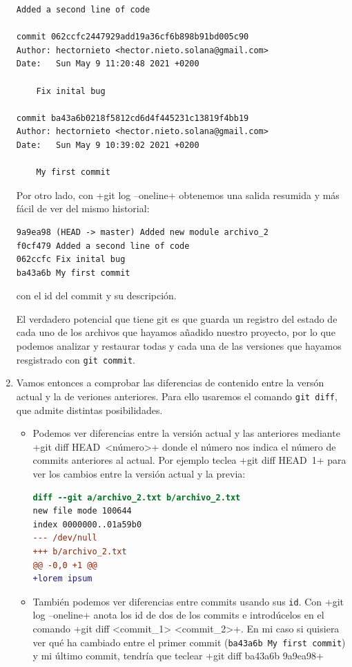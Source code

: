 \documentclass[a4paper,10pt]{article}
\begin{document}
\begin{enumerate}
\begin{lstlisting}[style=custom]
    Added a second line of code

commit 062ccfc2447929add19a36cf6b898b91bd005c90
Author: hectornieto <hector.nieto.solana@gmail.com>
Date:   Sun May 9 11:20:48 2021 +0200

    Fix inital bug

commit ba43a6b0218f5812cd6d4f445231c13819f4bb19
Author: hectornieto <hector.nieto.solana@gmail.com>
Date:   Sun May 9 10:39:02 2021 +0200

    My first commit
    \end{lstlisting}
    
    Por otro lado, con \cverb+git log --oneline+ obtenemos una salida resumida y más fácil de ver del mismo historial:
    \begin{lstlisting}[style=custom]
9a9ea98 (HEAD -> master) Added new module archivo_2
f0cf479 Added a second line of code
062ccfc Fix inital bug
ba43a6b My first commit
    \end{lstlisting}
    con el id del commit y su descripción.
    
    El verdadero potencial que tiene git es que guarda un registro del estado de cada uno de los archivos que hayamos añadido nuestro proyecto, por lo que podemos analizar y restaurar todas y cada una de las versiones que hayamos resgistrado con \verb+git commit+.
    
    \item Vamos entonces a comprobar las diferencias de contenido entre la versón actual y la de veriones anteriores. Para ello usaremos el comando \verb+git diff+, que admite distintas posibilidades. 
    \begin{itemize}
      \item Podemos ver diferencias entre la versión actual y las anteriores mediante \cverb+git diff HEAD~<número>+ donde el número nos indica el número de commits anteriores al actual. Por ejemplo teclea 
      \cverb+git diff HEAD~1+ 
      para ver los cambios entre la versión actual y la previa:
      \begin{lstlisting}[language=diff]
diff --git a/archivo_2.txt b/archivo_2.txt
new file mode 100644
index 0000000..01a59b0
--- /dev/null
+++ b/archivo_2.txt
@@ -0,0 +1 @@
+lorem ipsum
      \end{lstlisting}
      
      \item También podemos ver diferencias entre commits usando sus \verb+id+. Con \cverb+git log --oneline+ anota los id de dos de los commits e introdúcelos en el comando \cverb+git diff <commit_1> <commit_2>+. En mi caso si quisiera ver qué ha cambiado entre el primer commit (\verb+ba43a6b My first commit+) y mi último commit, tendría que teclear \cverb+git diff ba43a6b 9a9ea98+
      

\end{itemize}
\end{enumerate}
\end{document}
